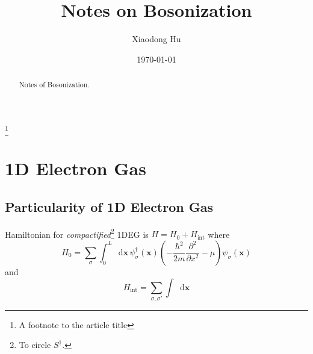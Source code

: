 \documentclass[10pt,nofootinbib]{revtex4}
\newcommand*\dd{\mathop{}\!\mathrm{d}}
\begin{document}
\title{Notes on Bosonization}%
\thanks{A footnote to the article title}%

\author{Xiaodong Hu}

\date{\today}


\begin{abstract}
Notes of Bosonization.
\end{abstract}
\maketitle
\tableofcontents
\section{1D Electron Gas}
	\subsection{Particularity of 1D Electron Gas}
		Hamiltonian for \emph{compactified}\footnote{To circle $S^1$.} 1DEG is $H=H_0+H_{\text{int}}$ where
		\begin{equation}\label{1.1.1}
			H_0=\sum_{\sigma}\int_0^L\dd\bm{x}\,\psi^\dagger_\sigma(\bm{x}) \left(-\dfrac{\hbar^2}{2m}\dfrac{\partial^2}{\partial x^2}-\mu\right) \psi_\sigma(\bm{x})
		\end{equation}
		and
		\begin{equation}\label{1.1.2}
			H_{\text{int}}=\sum_{\sigma,\sigma'}\int\dd\bm{x}
		\end{equation}
\end{document}
